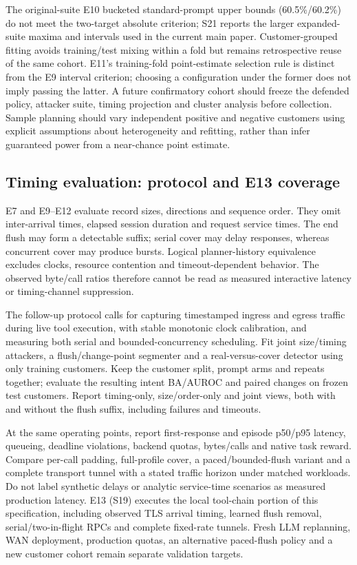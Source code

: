 The original-suite E10 bucketed standard-prompt upper bounds (60.5\%/60.2\%) do not meet the two-target absolute criterion; S21 reports the larger expanded-suite maxima and intervals used in the current main paper. Customer-grouped fitting avoids training/test mixing within a fold but remains retrospective reuse of the same cohort. E11's training-fold point-estimate selection rule is distinct from the E9 interval criterion; choosing a configuration under the former does not imply passing the latter. A future confirmatory cohort should freeze the defended policy, attacker suite, timing projection and cluster analysis before collection. Sample planning should vary independent positive and negative customers using explicit assumptions about heterogeneity and refitting, rather than infer guaranteed power from a near-chance point estimate.

\subsection{Timing evaluation: protocol and E13 coverage}
E7 and E9--E12 evaluate record sizes, directions and sequence order. They omit inter-arrival times, elapsed session duration and request service times. The end flush may form a detectable suffix; serial cover may delay responses, whereas concurrent cover may produce bursts. Logical planner-history equivalence excludes clocks, resource contention and timeout-dependent behavior. The observed byte/call ratios therefore cannot be read as measured interactive latency or timing-channel suppression.

The follow-up protocol calls for capturing timestamped ingress and egress traffic during live tool execution, with stable monotonic clock calibration, and measuring both serial and bounded-concurrency scheduling. Fit joint size/timing attackers, a flush/change-point segmenter and a real-versus-cover detector using only training customers. Keep the customer split, prompt arms and repeats together; evaluate the resulting intent BA/AUROC and paired changes on frozen test customers. Report timing-only, size/order-only and joint views, both with and without the flush suffix, including failures and timeouts.

At the same operating points, report first-response and episode p50/p95 latency, queueing, deadline violations, backend quotas, bytes/calls and native task reward. Compare per-call padding, full-profile cover, a paced/bounded-flush variant and a complete transport tunnel with a stated traffic horizon under matched workloads. Do not label synthetic delays or analytic service-time scenarios as measured production latency. E13 (S19) executes the local tool-chain portion of this specification, including observed TLS arrival timing, learned flush removal, serial/two-in-flight RPCs and complete fixed-rate tunnels. Fresh LLM replanning, WAN deployment, production quotas, an alternative paced-flush policy and a new customer cohort remain separate validation targets.
